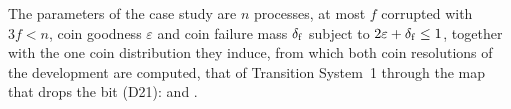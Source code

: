 \begin{definition}
  \label{def:aba-parameters}
  \leanok
  The parameters of the case study are $n$ processes, at most $f$ corrupted with $3f < n$, coin goodness $\varepsilon$ and coin failure mass $\delta_{\mathrm{f}}$ subject to $2\varepsilon + \delta_{\mathrm{f}} \le 1$, together with the one coin distribution they induce, from which both coin resolutions of the development are computed, that of Transition System~1 through the map that drops the bit (D21):  and .
\end{definition}
